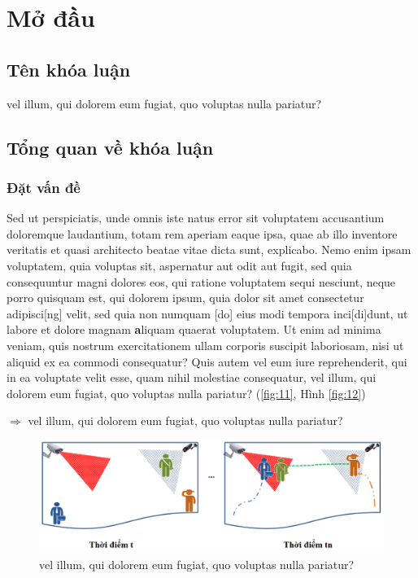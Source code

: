 
\chapter{Mở đầu}

\section{Tên khóa luận}

vel illum, qui dolorem eum fugiat, quo voluptas nulla pariatur?

\section{Tổng quan về khóa luận}

\subsection{Đặt vấn đề}

Sed ut perspiciatis, unde omnis iste natus error sit voluptatem accusantium doloremque laudantium, totam rem aperiam eaque ipsa, quae ab illo inventore veritatis et quasi architecto beatae vitae dicta sunt, explicabo. Nemo enim ipsam voluptatem, quia voluptas sit, aspernatur aut odit aut fugit, sed quia consequuntur magni dolores eos, qui ratione voluptatem sequi nesciunt, neque porro quisquam est, qui dolorem ipsum, quia dolor sit amet consectetur adipisci[ng] velit, sed quia non numquam [do] eius modi tempora inci[di]dunt, ut labore et dolore magnam {\textbf aliquam quaerat voluptatem}. Ut enim ad minima veniam, quis nostrum exercitationem ullam corporis suscipit laboriosam, nisi ut aliquid ex ea commodi consequatur? Quis autem vel eum iure reprehenderit, qui in ea voluptate velit esse, quam nihil molestiae consequatur, vel illum, qui dolorem eum fugiat, quo voluptas nulla pariatur? (\autoref{fig:11}, Hình \ref{fig:12})

$\Rightarrow$ vel illum, qui dolorem eum fugiat, quo voluptas nulla pariatur?

\begin{figure}
  \includegraphics[width=\linewidth]{Chapter1/Figure/1.png}
  \caption{vel illum, qui dolorem eum fugiat, quo voluptas nulla pariatur?}
  \label{fig:11}
\end{figure}

